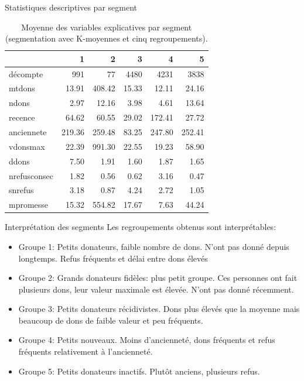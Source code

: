\documentclass[
  ignorenonframetext,
]{beamer}
\providecommand{\tightlist}{%
  \setlength{\itemsep}{0pt}\setlength{\parskip}{0pt}}\usepackage{longtable,booktabs,array}
\begin{document}
\begin{frame}{Statistiques descriptives par segment}
\protect\hypertarget{statistiques-descriptives-par-segment}{}
\footnotesize

\hypertarget{tbl-kmoy5resume}{}
\begin{table}
\caption{\label{tbl-kmoy5resume}Moyenne des variables explicatives par segment (segmentation avec
K-moyennes et cinq regroupements). }\tabularnewline

\centering
\begin{tabular}{lrrrrr}
\toprule
  & 1 & 2 & 3 & 4 & 5\\
\midrule
décompte & 991 & 77 & 4480 & 4231 & 3838\\
mtdons & 13.91 & 408.42 & 15.33 & 12.11 & 24.16\\
ndons & 2.97 & 12.16 & 3.98 & 4.61 & 13.64\\
recence & 64.62 & 60.55 & 29.02 & 172.41 & 27.72\\
anciennete & 219.36 & 259.48 & 83.25 & 247.80 & 252.41\\
vdonsmax & 22.39 & 991.30 & 22.55 & 19.23 & 58.90\\
ddons & 7.50 & 1.91 & 1.60 & 1.87 & 1.65\\
nrefusconsec & 1.82 & 0.56 & 0.62 & 3.16 & 0.47\\
snrefus & 3.18 & 0.87 & 4.24 & 2.72 & 1.05\\
mpromesse & 15.32 & 554.82 & 17.67 & 7.63 & 44.24\\
\bottomrule
\end{tabular}
\end{table}
\end{frame}

\begin{frame}{Interprétation des segments}
\protect\hypertarget{interpruxe9tation-des-segments}{}
Les regroupements obtenus sont interprétables:

\begin{itemize}
\tightlist
\item
  Groupe 1: Petits donateurs, faible nombre de dons. N'ont pas donné
  depuis longtemps. Refus fréquents et délai entre dons élevés
\item
  Groupe 2: Grands donateurs fidèles: plus petit groupe. Ces personnes
  ont fait plusieurs dons, leur valeur maximale est élevée. N'ont pas
  donné récemment.
\item
  Groupe 3: Petits donateurs récidivistes. Dons plus élevés que la
  moyenne mais beaucoup de dons de faible valeur et peu fréquents.
\item
  Groupe 4: Petits nouveaux. Moins d'ancienneté, dons fréquents et refus
  fréquents relativement à l'ancienneté.
\item
  Groupe 5: Petits donateurs inactifs. Plutôt anciens, plusieurs refus.
\end{itemize}
\end{frame}
\end{document}
